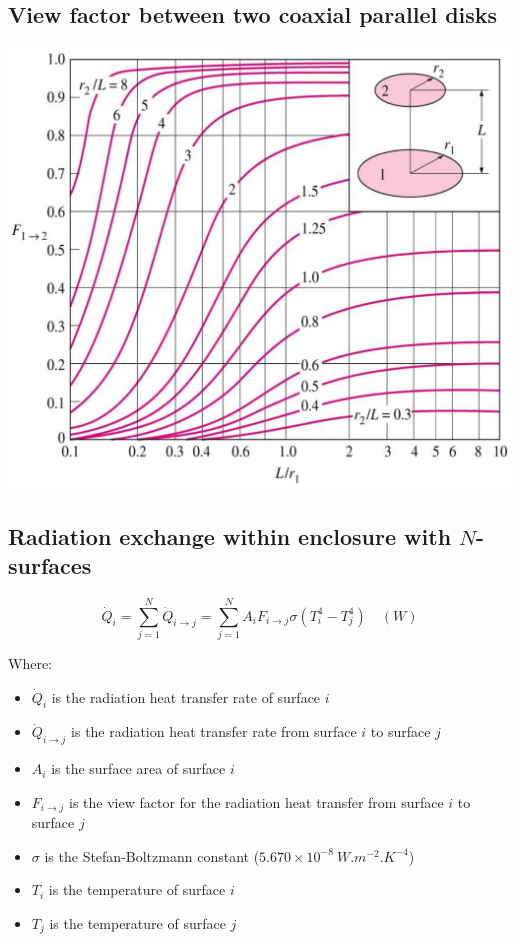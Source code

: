 \documentclass[11pt]{article}
\begin{document}
\subsection{View factor between two coaxial parallel disks}
\label{sec:orga18a40e}
\begin{center}
\includegraphics[width=.9\linewidth]{./images/view-factors-between-two-coaxial-parallel-disks-graph.png}
\end{center}

 \newpage
\subsection{Radiation exchange within enclosure with \(N\)-surfaces}
\label{sec:org33327b9}
\[\dot{Q}_i = \sum_{j=1}^N \dot{Q}_{i \rightarrow j} = \sum_{j=1}^N A_i F_{i \rightarrow j} \sigma (T_i^4 - T_j^4) \quad (\unit{W}) \]

Where:
\begin{itemize}
\item \(\dot{Q}_i\) is the radiation heat transfer rate of surface \(i\)
\item \(\dot{Q}_{i \rightarrow j}\) is the radiation heat transfer rate from surface \(i\) to surface \(j\)
\item \(A_i\) is the surface area of surface \(i\)
\item \(F_{i \rightarrow j}\) is the view factor for the radiation heat transfer from surface \(i\) to surface \(j\)
\item \(\sigma\) is the Stefan-Boltzmann constant (\(5.670 \times 10^{-8} \ \unit{W.m^{-2}.K^{-4}}\))
\item \(T_i\) is the temperature of surface \(i\)
\item \(T_j\) is the temperature of surface \(j\)
\end{itemize}
\end{document}
